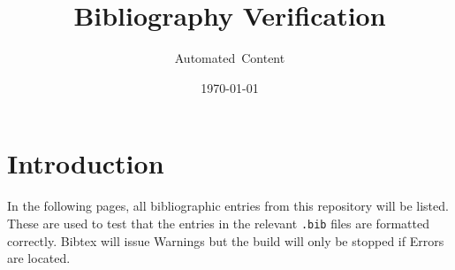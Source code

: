 \documentclass[DM,toc]{lsstdoc}
\title[Bib testing]{Bibliography Verification}
\author{Automated~Content}
\date{\today}
\begin{document}
\maketitle

\section{Introduction}

In the following pages, all bibliographic entries from this repository will be listed.
These are used to test that the entries in the relevant \texttt{.bib} files are formatted correctly.
Bibtex will issue Warnings but the build will only be stopped if Errors are located.

\nocite{*}



\end{document}
